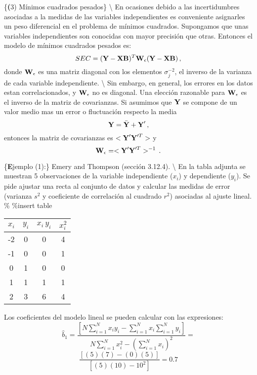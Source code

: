 \documentclass[
]{agujournal2019}
\begin{document}
\{\noindent \textbf (3) Mínimos cuadrados pesados\} \textbackslash{}
\noindent En ocasiones debido a las incertidumbres asociadas a la
medidas de las variables independientes es conveniente asignarles un
peso diferencial en el problema de mínimos cuadrados. Supongamos que
unas variables independientes son conocidas con mayor precisión que
otras. Entonces el modelo de mínimos cuadrados pesados es:
\[SEC=({\textbf Y}-{\textbf X}{\textbf B})^T{\textbf W}_{\epsilon}({\textbf Y}-{\textbf X}{\textbf B})\,,\]
donde \({\textbf W}_{\epsilon}\) es una matriz diagonal con los
elementos \(\sigma_j^{-2}\), el inverso de la varianza de cada variable
independiente. \textbackslash{} \noindent Sin embargo, en general, los
errores en los datos estan correlacionados, y \({\textbf W}_{\epsilon}\)
no es diagonal. Una elección razonable para \({\textbf W}_{\epsilon}\)
es el inverso de la matriz de covarianzas. Si asumimos que
\({\textbf Y}\) se compone de un valor medio mas un error o fluctuación
respecto la media \[{\textbf Y}=\bar{\textbf Y}+{\textbf Y}'\,,\]
entonces la matriz de covarianzas es \(<{\textbf Y}'{\textbf Y}'^T>\) y
\[{\textbf W}_{\epsilon}=<{\textbf Y}'{\textbf Y}'^T>^{-1}\,.\]

\vspace{0.5cm}

\{\noindent \textbf Ejemplo (1):\} Emery and Thompson (sección 3.12.4).
\textbackslash{} \noindent En la tabla adjunta se muestran 5
observaciones de la variable independiente (\(x_i\)) y dependiente
(\(y_i\)). Se pide ajustar una recta al conjunto de datos y calcular las
medidas de error (varianza \(s^2\) y coeficiente de correlación al
cuadrado \(r^2\)) asociadas al ajuste lineal. \% \%insert table

\begin{center}
\begin{tabular}{c c c c}
\hline\hline
$x_i$ & $y_i$ & $x_i\,y_i$ & $x_i^2$ \\ [0.5ex] %
\hline
-2 & 0 & 0 & 4 \\
-1 & 0 & 0 & 1 \\
0 & 1 & 0 & 0 \\
1 & 1 & 1  & 1 \\
2 & 3 & 6 & 4 \\ [1ex] %
\hline
\end{tabular}
\end{center}

Los coeficientes del modelo lineal se pueden calcular con las
expresiones:
\[\hat{b}_1=\frac{\left[N \sum\limits^N_{i=1} x_i y_i - \sum\limits^N_{i=1}x_i \sum\limits^N_{i=1}y_i\right]}
           {N\sum\limits^N_{i=1}x^2_i-\left(\sum\limits^N_{i=1}x_i \right)^2}=\]
\[\frac{[(5)(7)-(0)(5)]}{[(5)(10)-10^2]}=0.7\]
\end{document}
